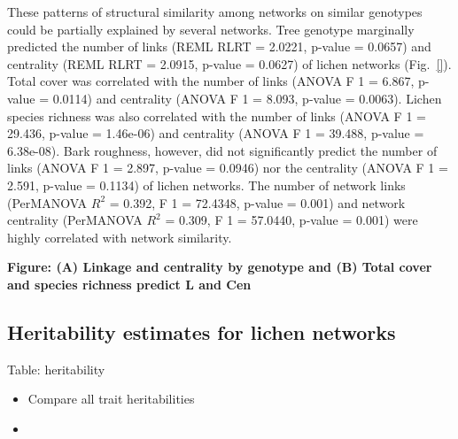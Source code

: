 \documentclass[9pt,twocolumn,twoside,lineno]{pnas-new}
\begin{document}
{These patterns of structural similarity among networks on similar
genotypes could be partially explained by several networks. Tree
genotype marginally predicted the number of links (REML RLRT = 2.0221,
p-value = 0.0657) and centrality (REML RLRT = 2.0915, p-value =
0.0627) of lichen networks (Fig.~\ref{}). Total cover was correlated with the number
of links (ANOVA F 1 = 6.867, p-value = 0.0114) and centrality (ANOVA F
1 = 8.093, p-value = 0.0063). Lichen species richness was also
correlated with the number of links (ANOVA F 1 = 29.436, p-value =
1.46e-06) and centrality (ANOVA F 1 = 39.488, p-value =
6.38e-08). Bark roughness, however, did not significantly predict the
number of links (ANOVA F 1 = 2.897, p-value = 0.0946) nor the
centrality (ANOVA F 1 = 2.591, p-value = 0.1134) of lichen networks.
The number of network links (PerMANOVA $R^2$ = 0.392, F 1 = 72.4348,
p-value = 0.001) and network centrality (PerMANOVA $R^2$ = 0.309, F 1 =
57.0440, p-value = 0.001) were highly correlated with network
similarity.

\textbf{Figure: (A) Linkage and centrality by genotype and (B) Total
  cover and species richness predict L and Cen}


\subsection*{Heritability estimates for lichen networks}

Table: heritability

\begin{itemize}
\item Compare all trait heritabilities
\item 
\end{itemize}


}
\end{document}
